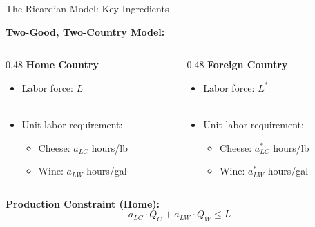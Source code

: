 \documentclass{beamer}
\begin{document}

\begin{frame}{The Ricardian Model: Key Ingredients}
\vspace{-0.5cm}

\textbf{Two-Good, Two-Country Model:}

\vspace{0.5cm}

\begin{columns}[T]
\begin{column}{0.48\textwidth}
\textbf{Home Country}
\vspace{0.25cm}
\begin{itemize}
    \item Labor force: $L$ \\~\\
    \item Unit labor requirement:
    \begin{itemize}
        \item Cheese: $a_{LC}$ hours/lb
        \item Wine: $a_{LW}$ hours/gal
    \end{itemize}
\end{itemize}
\end{column}

\begin{column}{0.48\textwidth}
\textbf{Foreign Country}
\vspace{0.25cm}
\begin{itemize}
    \item Labor force: $L^*$ \\~\\
    \item Unit labor requirement:
    \begin{itemize}
        \item Cheese: $a^*_{LC}$ hours/lb
        \item Wine: $a^*_{LW}$ hours/gal
    \end{itemize}
\end{itemize}
\end{column}
\end{columns}

\vspace{0.5cm}

\textbf{Production Constraint (Home):}
$$a_{LC} \cdot Q_C + a_{LW} \cdot Q_W \leq L$$

\end{frame}
\end{document}

